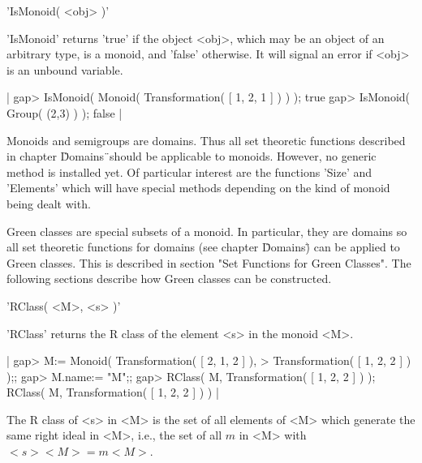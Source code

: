 %

'IsMonoid( <obj> )'

'IsMonoid' returns 'true' if the object <obj>,  which may be an object of
an arbitrary type, is a monoid, and 'false' otherwise.  It will signal an
error if <obj> is an unbound variable.

|    gap> IsMonoid( Monoid( Transformation( [ 1, 2, 1 ] ) ) );
    true
    gap> IsMonoid( Group( (2,3) ) ); 
    false |


Monoids and semigroups  are domains.   Thus  all set theoretic  functions
described  in chapter \"Domains\"\   should be  applicable  to   monoids. 
However, no generic method is  installed yet.  Of particular interest are
the functions 'Size'   and  'Elements' which will  have   special methods
depending on the kind of monoid being dealt with.


Green classes  are special subsets of a  monoid.  In particular, they are
domains    so all  set  theoretic   functions  for   domains (see chapter
\"Domains\")  can be   applied to Green  classes.   This  is described in
section  "Set  Functions for   Green  Classes".  The  following  sections
describe how Green classes can be constructed.


'RClass( <M>, <s> )'

'RClass' returns the R class of the element <s> in the monoid <M>.

|    gap> M:= Monoid( Transformation( [ 2, 1, 2 ] ), 
    > Transformation( [ 1, 2, 2 ] ) );;
    gap> M.name:= "M";;
    gap> RClass( M, Transformation( [ 1, 2, 2 ] ) );
    RClass( M, Transformation( [ 1, 2, 2 ] ) ) |

The  R class of  <s>  in <M> is  the  set of  all  elements of <M>  which
generate the same  right ideal in <M>, i.e.,  the set of  all $m$  in <M>
with $<s> <M> = m <M>$.

%

